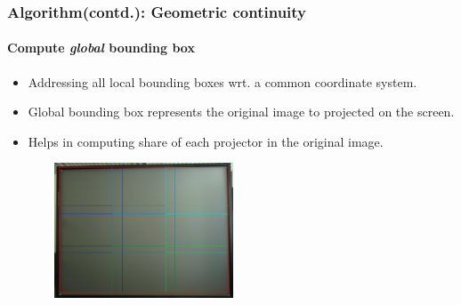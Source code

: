 \documentclass{beamer}
\begin{document}

\begin{frame}
\frametitle{Algorithm(contd.): Geometric continuity}
\framesubtitle{Compute \textit{global} bounding box}
\begin{itemize}
\item Addressing all local bounding boxes wrt. a common coordinate system. 
\item Global bounding box represents the original image to projected on the screen.
\item Helps in computing share of each projector in the original image.
\end{itemize}

\begin{figure}
\includegraphics[width=6cm,height=4cm]{figures/test.jpg}
\end{figure}
\end{frame}

\end{document}
